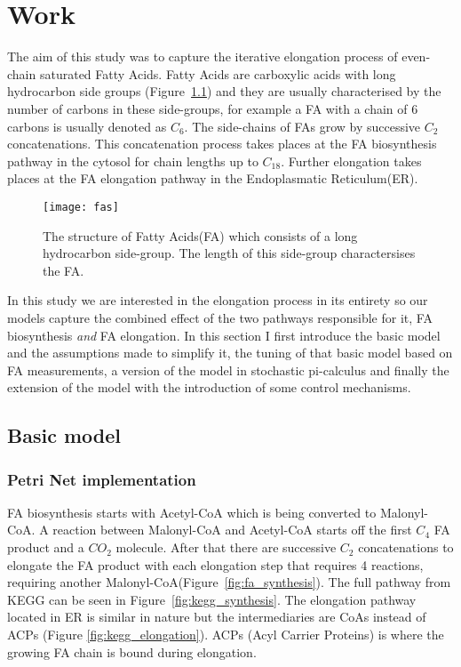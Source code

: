 \chapter{Work}
\label{chap:work}
\ifpdf
    \graphicspath{{Chapter3/Figs/Raster/}{Chapter3/Figs/PDF/}{Chapter3/Figs/}}
\else
    \graphicspath{{Chapter3/Figs/Vector/}{Chapter3/Figs/}}
\fi

The aim of this study was to capture the iterative elongation process
of even-chain saturated Fatty Acids. Fatty Acids are
carboxylic acids with long hydrocarbon side groups
(Figure~\ref{fig:fas}) and they are usually characterised by the
number of carbons in these side-groups, for example a FA with a chain
of 6 carbons is usually denoted as $C_6$. The side-chains of FAs grow
by successive $C_2$ concatenations. This concatenation process takes places at
the FA biosynthesis pathway in the cytosol for chain lengths up to
$C_{18}$. Further elongation takes places at the FA elongation
pathway in the Endoplasmatic Reticulum(ER).

\begin{figure}[htbp!]
\centering
\texttt{[image: fas]}
\caption[Fatty Acid structure]{The structure of Fatty Acids(FA) which
  consists of a long hydrocarbon side-group. The length of this
  side-group charactersises the FA.}
\label{fig:fas}
\end{figure}

In this study we are interested in the elongation process in its
entirety so our models capture the combined effect of the two pathways
responsible for it, FA biosynthesis \textit{and} FA elongation. In
this section I first introduce the basic model and the assumptions
made to simplify it, the tuning of that basic model based on FA
measurements, a version of the model in stochastic pi-calculus and
finally the extension of the model with the introduction of some
control mechanisms.

\section{Basic model}
\subsection{Petri Net implementation}
\label{sec:pn_implementation}
FA biosynthesis starts with Acetyl-CoA which is being converted to
Malonyl-CoA. A reaction between Malonyl-CoA and Acetyl-CoA starts off
the first $C_4$ FA product and a $CO_2$ molecule. After that there are successive $C_2$
concatenations to elongate the FA product with each elongation step
that requires 4 reactions, requiring another Malonyl-CoA(Figure~\ref{fig:fa_synthesis}). The
full pathway from KEGG can be seen in
Figure~\ref{fig:kegg_synthesis}. The elongation pathway located in ER
is similar in nature but the intermediaries are CoAs instead of
ACPs (Figure \ref{fig:kegg_elongation}). ACPs (Acyl Carrier Proteins)
is where the growing FA chain is bound during elongation.

